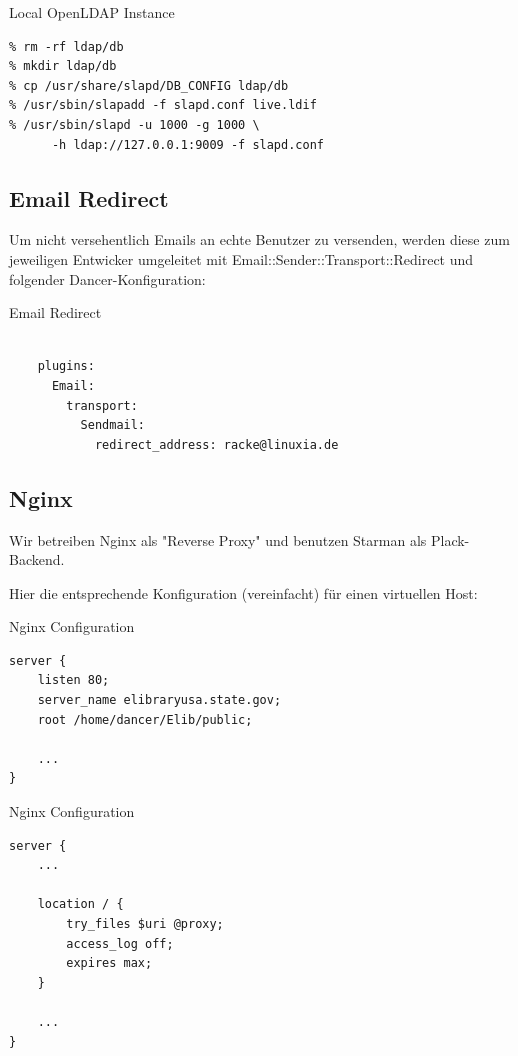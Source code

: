 \begin{frame}[fragile]{Local OpenLDAP Instance}
\begin{lstlisting}
% rm -rf ldap/db
% mkdir ldap/db
% cp /usr/share/slapd/DB_CONFIG ldap/db
% /usr/sbin/slapadd -f slapd.conf live.ldif
% /usr/sbin/slapd -u 1000 -g 1000 \
      -h ldap://127.0.0.1:9009 -f slapd.conf
\end{lstlisting}
\end{frame}

\subsection{Email Redirect}

Um nicht versehentlich Emails an echte Benutzer zu versenden,
werden diese zum jeweiligen Entwicker umgeleitet mit
Email::Sender::Transport::Redirect und folgender
Dancer-Konfiguration:

\begin{frame}[fragile]{Email Redirect}
\begin{lstlisting}

    plugins:
      Email:
        transport:
          Sendmail:
            redirect_address: racke@linuxia.de

\end{lstlisting}
\end{frame}

\subsection{Nginx}
    
Wir betreiben Nginx als "Reverse Proxy" und benutzen Starman als
Plack-Backend.

Hier die entsprechende Konfiguration (vereinfacht) für einen virtuellen
Host:

\begin{frame}[fragile]{Nginx Configuration}
\begin{lstlisting}
server {
    listen 80;
    server_name elibraryusa.state.gov;
    root /home/dancer/Elib/public;

    ...
}
\end{lstlisting}
\end{frame}

\begin{frame}[fragile]{Nginx Configuration}
\begin{lstlisting}
server {
    ...

    location / {
        try_files $uri @proxy;
        access_log off;
        expires max;
    }

    ...
}
\end{lstlisting}
\end{frame}

